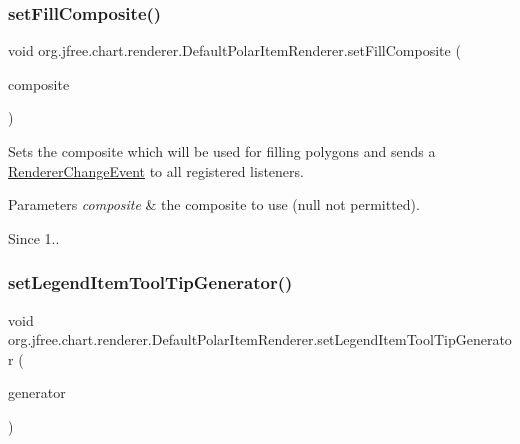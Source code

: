 \subsubsection{\texorpdfstring{set\+Fill\+Composite()}{setFillComposite()}}
{\footnotesize\ttfamily void org.\+jfree.\+chart.\+renderer.\+Default\+Polar\+Item\+Renderer.\+set\+Fill\+Composite (\begin{DoxyParamCaption}\item[{Composite}]{composite }\end{DoxyParamCaption})}

Sets the composite which will be used for filling polygons and sends a \mbox{\hyperlink{}{Renderer\+Change\+Event}} to all registered listeners.


\begin{DoxyParams}{Parameters}
{\em composite} & the composite to use ({\ttfamily null} not permitted).\\
\hline
\end{DoxyParams}
\begin{DoxySince}{Since}
1.. 
\end{DoxySince}
\mbox{\label{classorg_1_1jfree_1_1chart_1_1renderer_1_1_default_polar_item_renderer_a7fa6c62b2e0f8dbcf54924e6703ff591}} 
\subsubsection{\texorpdfstring{set\+Legend\+Item\+Tool\+Tip\+Generator()}{setLegendItemToolTipGenerator()}}
{\footnotesize\ttfamily void org.\+jfree.\+chart.\+renderer.\+Default\+Polar\+Item\+Renderer.\+set\+Legend\+Item\+Tool\+Tip\+Generator (\begin{DoxyParamCaption}\item[{\mbox{\hyperlink{interfaceorg_1_1jfree_1_1chart_1_1labels_1_1_x_y_series_label_generator}{X\+Y\+Series\+Label\+Generator}}}]{generator }\end{DoxyParamCaption})}

